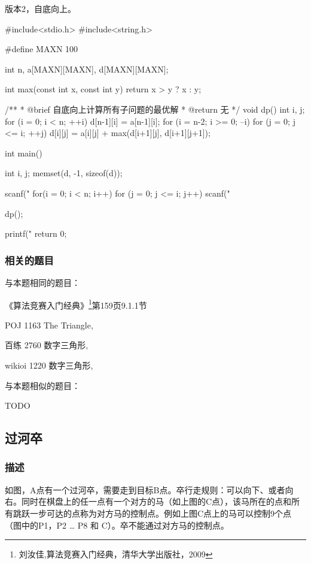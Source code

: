 版本2，自底向上。

\begin{Codex}[label=numbers_triangle2.c]
#include<stdio.h>
#include<string.h>

#define MAXN 100

int n, a[MAXN][MAXN], d[MAXN][MAXN];

int max(const int x, const int y) {
    return x > y ? x : y;
}

/**
 * @brief 自底向上计算所有子问题的最优解
 * @return 无
 */
void dp() {
    int i, j;
    for (i = 0; i < n; ++i) {
        d[n-1][i] = a[n-1][i];
    }
    for (i = n-2; i >= 0; --i)
      for (j = 0; j <= i; ++j)
        d[i][j] = a[i][j] + max(d[i+1][j], d[i+1][j+1]);
}

int main() {
    int i, j;
    memset(d, -1, sizeof(d));

    scanf("%
    for(i = 0; i < n; i++)
      for (j = 0; j <= i; j++) 
          scanf("%

    dp();
    
    printf("%
    return 0;
}
\end{Codex}

\subsubsection{相关的题目}
与本题相同的题目：
\begindot
\item 《算法竞赛入门经典》\footnote{刘汝佳,算法竞赛入门经典，清华大学出版社，2009}第159页9.1.1节
\item POJ 1163 The Triangle, 
\item 百练 2760 数字三角形, 
\item wikioi 1220 数字三角形, 
\myenddot

与本题相似的题目：
\begindot
\item  TODO
\myenddot


\subsection{过河卒}

\subsubsection{描述}
如图，A点有一个过河卒，需要走到目标B点。卒行走规则：可以向下、或者向右。同时在棋盘上的任一点有一个对方的马（如上图的C点），该马所在的点和所有跳跃一步可达的点称为对方马的控制点。例如上图C点上的马可以控制9个点（图中的P1，P2 … P8 和 C）。卒不能通过对方马的控制点。

